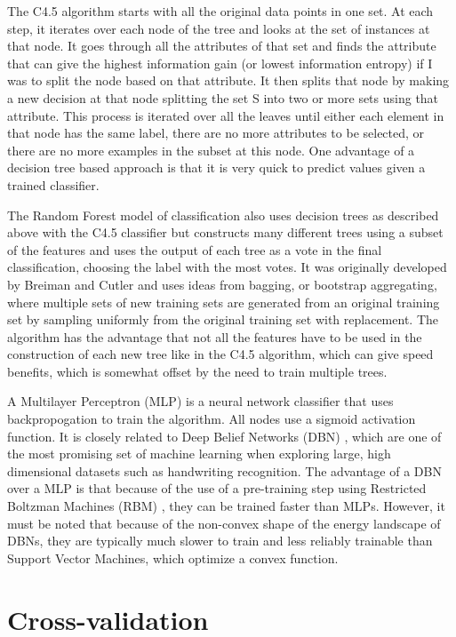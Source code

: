 \documentclass[12pt,oneside]{book}
\begin{document}
The C4.5 algorithm starts with all the original data points in one
set.  At each step, it iterates over each node of the tree and looks
at the set of instances at that node.  It goes through all the
attributes of that set and finds the attribute that can give the
highest information gain (or lowest information entropy) if I was to
split the node based on that attribute.  It then splits that node by
making a new decision at that node splitting the set S into two or
more sets using that attribute.  This process is iterated over all the
leaves until either each element in that node has the same label,
there are no more attributes to be selected, or there are no more
examples in the subset at this node.  One advantage of a decision tree
based approach is that it is very quick to predict values given a
trained classifier.

The Random Forest model of classification also uses decision trees as
described above with the C4.5 classifier but constructs many
different trees using a subset of the features and uses the output of
each tree as a vote in the final classification, choosing the label
with the most votes.  It was originally developed by Breiman and
Cutler \cite{breiman2001random} and uses ideas from bagging, or
bootstrap aggregating, where multiple sets of new training sets are
generated from an original training set by sampling uniformly from the
original training set with replacement.  The algorithm has the
advantage that not all the features have to be used in the
construction of each new tree like in the C4.5 algorithm, which can
give speed benefits, which is somewhat offset by the need to train
multiple trees.

A Multilayer Perceptron (MLP) \cite{ruck1990multilayer} is a neural
network classifier that uses backpropogation to train the algorithm.
All nodes use a sigmoid activation function.  It is closely related to
Deep Belief Networks (DBN) \cite{rumelhart2002learning}, which are one
of the most promising set of machine learning when exploring large,
high dimensional datasets such as handwriting recognition. The
advantage of a DBN over a MLP is that because of the use of a
pre-training step using Restricted Boltzman Machines (RBM)
\cite{hinton2006fast}, they can be trained faster than MLPs.  However,
it must be noted that because of the non-convex shape of the energy
landscape of DBNs, they are typically much slower to train and less
reliably trainable than Support Vector Machines, which optimize a
convex function.

\section{Cross-validation}
\label{section:analysis:crossvalidation}
\end{document}
